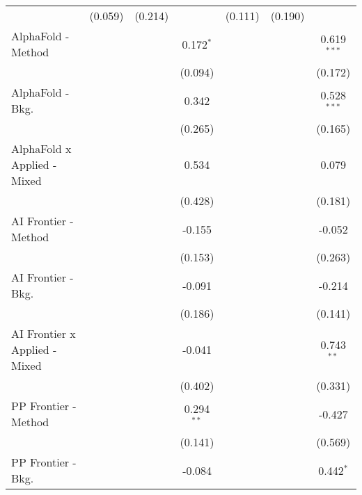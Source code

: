 \begin{tabular}{lcccccc}
                                  & (0.059)        & (0.214)      &                & (0.111)       & (0.190)       &   \\   
   AlphaFold - Method             &                &              & 0.172$^{*}$    &               &               & 0.619$^{***}$\\   
                                  &                &              & (0.094)        &               &               & (0.172)\\   
   AlphaFold - Bkg.               &                &              & 0.342          &               &               & 0.528$^{***}$\\   
                                  &                &              & (0.265)        &               &               & (0.165)\\   
   AlphaFold x Applied - Mixed    &                &              & 0.534          &               &               & 0.079\\   
                                  &                &              & (0.428)        &               &               & (0.181)\\   
   AI Frontier - Method           &                &              & -0.155         &               &               & -0.052\\   
                                  &                &              & (0.153)        &               &               & (0.263)\\   
   AI Frontier - Bkg.             &                &              & -0.091         &               &               & -0.214\\   
                                  &                &              & (0.186)        &               &               & (0.141)\\   
   AI Frontier x Applied - Mixed  &                &              & -0.041         &               &               & 0.743$^{**}$\\   
                                  &                &              & (0.402)        &               &               & (0.331)\\   
   PP Frontier - Method           &                &              & 0.294$^{**}$   &               &               & -0.427\\   
                                  &                &              & (0.141)        &               &               & (0.569)\\   
   PP Frontier - Bkg.             &                &              & -0.084         &               &               & 0.442$^{*}$\\   

\end{tabular}
